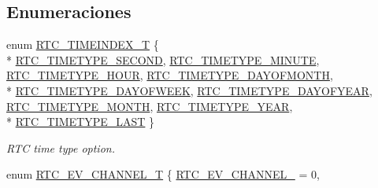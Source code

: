 \subsection*{Enumeraciones}
\begin{DoxyCompactItemize}
\item 
enum \hyperlink{group___r_t_c__18_x_x__43_x_x_ga8144898fe628404d396db06dc8aac0e0}{R\+T\+C\+\_\+\+T\+I\+M\+E\+I\+N\+D\+E\+X\+\_\+T} \{ \\*
\hyperlink{group___r_t_c__18_x_x__43_x_x_gga8144898fe628404d396db06dc8aac0e0ac0bdc1ff011be37cfeecb77c241e7fb8}{R\+T\+C\+\_\+\+T\+I\+M\+E\+T\+Y\+P\+E\+\_\+\+S\+E\+C\+O\+ND}, 
\hyperlink{group___r_t_c__18_x_x__43_x_x_gga8144898fe628404d396db06dc8aac0e0a11974e5996bfe6fbf0381d7ef3836964}{R\+T\+C\+\_\+\+T\+I\+M\+E\+T\+Y\+P\+E\+\_\+\+M\+I\+N\+U\+TE}, 
\hyperlink{group___r_t_c__18_x_x__43_x_x_gga8144898fe628404d396db06dc8aac0e0a4e88c263358395fecc19306556addacc}{R\+T\+C\+\_\+\+T\+I\+M\+E\+T\+Y\+P\+E\+\_\+\+H\+O\+UR}, 
\hyperlink{group___r_t_c__18_x_x__43_x_x_gga8144898fe628404d396db06dc8aac0e0a3cc8b55755f86e8a6a1a870a79122324}{R\+T\+C\+\_\+\+T\+I\+M\+E\+T\+Y\+P\+E\+\_\+\+D\+A\+Y\+O\+F\+M\+O\+N\+TH}, 
\\*
\hyperlink{group___r_t_c__18_x_x__43_x_x_gga8144898fe628404d396db06dc8aac0e0a88f328753d58927fafd45b35e0815e80}{R\+T\+C\+\_\+\+T\+I\+M\+E\+T\+Y\+P\+E\+\_\+\+D\+A\+Y\+O\+F\+W\+E\+EK}, 
\hyperlink{group___r_t_c__18_x_x__43_x_x_gga8144898fe628404d396db06dc8aac0e0ad05ce02297b482d4fa5b6a491ff04aff}{R\+T\+C\+\_\+\+T\+I\+M\+E\+T\+Y\+P\+E\+\_\+\+D\+A\+Y\+O\+F\+Y\+E\+AR}, 
\hyperlink{group___r_t_c__18_x_x__43_x_x_gga8144898fe628404d396db06dc8aac0e0a45d2078908fb25a714cbd01766f55fae}{R\+T\+C\+\_\+\+T\+I\+M\+E\+T\+Y\+P\+E\+\_\+\+M\+O\+N\+TH}, 
\hyperlink{group___r_t_c__18_x_x__43_x_x_gga8144898fe628404d396db06dc8aac0e0a780e93b1c505ed02ed139894566fcfe0}{R\+T\+C\+\_\+\+T\+I\+M\+E\+T\+Y\+P\+E\+\_\+\+Y\+E\+AR}, 
\\*
\hyperlink{group___r_t_c__18_x_x__43_x_x_gga8144898fe628404d396db06dc8aac0e0a0d4fafef57b6ef363f9a0875ff339cad}{R\+T\+C\+\_\+\+T\+I\+M\+E\+T\+Y\+P\+E\+\_\+\+L\+A\+ST}
 \}\begin{DoxyCompactList}\small\item\em R\+TC time type option. \end{DoxyCompactList}
\item 
enum \hyperlink{group___r_t_c__18_x_x__43_x_x_gaac7e8d7c66860037449fdde1bdfb657b}{R\+T\+C\+\_\+\+E\+V\+\_\+\+C\+H\+A\+N\+N\+E\+L\+\_\+T} \{ \hyperlink{group___r_t_c__18_x_x__43_x_x_ggaac7e8d7c66860037449fdde1bdfb657ba9e945d3545e1b313d7c8ab890dc98521}{R\+T\+C\+\_\+\+E\+V\+\_\+\+C\+H\+A\+N\+N\+E\+L\+\_} = 0, 

\end{DoxyCompactItemize}
